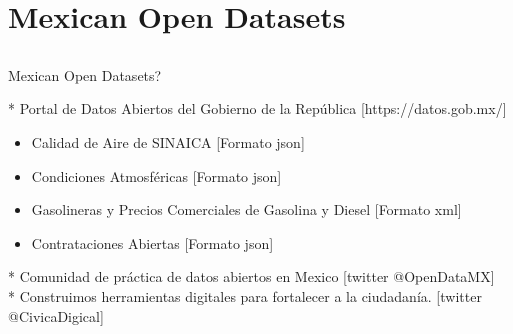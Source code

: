 \documentclass[compress]{beamer}
\begin{document}







\section{Mexican Open Datasets}





\subsection{}
{
\begin{frame}{Mexican Open Datasets?}


* Portal de Datos Abiertos del Gobierno de la República [https://datos.gob.mx/]

          \begin{itemize}
              \item Calidad de Aire de SINAICA [Formato json]
              \item Condiciones Atmosf\'ericas [Formato json]
              \item Gasolineras y Precios Comerciales de Gasolina y Diesel [Formato xml]
	      \item Contrataciones Abiertas [Formato json]
          \end{itemize}

* Comunidad de pr\'actica de datos abiertos en Mexico [twitter @OpenDataMX] \\


* Construimos herramientas digitales para fortalecer a la ciudadan\'ia. [twitter @CivicaDigical]


\end{frame}
}


\subsection{}
\end{document}
